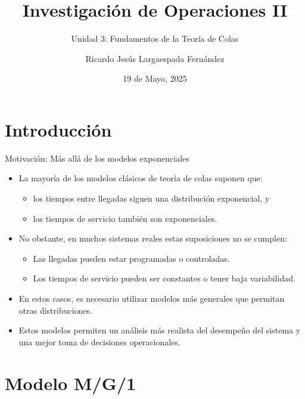 \documentclass{beamer}
\title{Investigación de Operaciones II}
\subtitle{Unidad 3: Fundamentos de la Teoría de Colas}
\author[RL]{Ricardo Jesús Largaespada Fernández}
\institute[UNI]{Ingeniería de Sistemas, DACTIC, UNI}
\date{19 de Mayo, 2025}
\begin{document}
\begin{frame}
  \titlepage
\end{frame}


\section*{Introducci\'on}

\begin{frame}{Motivación: Más allá de los modelos exponenciales}
  \begin{itemize}
    \item La mayoría de los modelos clásicos de teoría de colas suponen que:
    \begin{itemize}
      \item los tiempos entre llegadas siguen una distribución exponencial, y \pause
      \item los tiempos de servicio también son exponenciales. \pause
    \end{itemize}

    \item No obstante, en muchos sistemas reales estas suposiciones no se cumplen: \pause
    \begin{itemize}
      \item Las llegadas pueden estar programadas o controladas. \pause
      \item Los tiempos de servicio pueden ser constantes o tener baja variabilidad. \pause
    \end{itemize}

    \item En estos casos, es necesario utilizar modelos más generales que permitan otras distribuciones. \pause

    \item Estos modelos permiten un análisis más realista del desempeño del sistema y una mejor toma de decisiones operacionales.
  \end{itemize}
\end{frame}



\section*{Modelo M/G/1}
\end{document}
